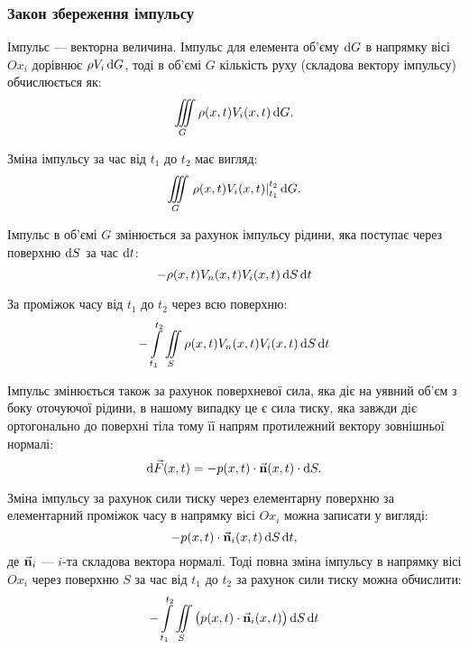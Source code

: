 \subsubsection{Закон збереження імпульсу}

Імпульс --- векторна величина. Імпульс для елемента об'єму $\diff G$ в напрямку вісі $Ox_i$ дорівнює $\rho V_i \diff G$, тоді в об'ємі $G$ кількість руху (складова вектору імпульсу) обчислюється як:
\begin{equation}
	\Iiint_G \rho(x, t) V_i(x, t) \diff G.
\end{equation}

Зміна імпульсу за час від $t_1$ до $t_2$ має вигляд: 
\begin{equation}
	\Iiint_G \left. \rho(x, t) V_i(x, t) \right|_{t_1}^{t_2} \diff G.
\end{equation}

Імпульс в об'ємі $G$ змінюється за рахунок імпульсу рідини, яка поступає через поверхню $\diff S$ за час $\diff t$:
\begin{equation}
	- \rho(x, t) V_n(x, t) V_i(x, t) \diff S \diff t
\end{equation}

За проміжок часу від $t_1$ до $t_2$ через всю поверхню:
\begin{equation}
	- \Int_{t_1}^{t_2} \Iint_S \rho(x, t) V_n(x, t) V_i(x, t) \diff S \diff t
\end{equation}

Імпульс змінюється також за рахунок поверхневої сила, яка діє на уявний об'єм з боку оточуючої рідини, в нашому випадку це є сила тиску, яка завжди діє ортогонально до поверхні тіла тому її напрям протилежний вектору зовнішньої нормалі: 
\begin{equation}
	\diff \vec F(x, t) = - p(x, t) \cdot \vec{\bf{n}} (x, t) \cdot \diff S.
\end{equation}

Зміна імпульсу за рахунок сили тиску через елементарну поверхню за елементарний проміжок часу в напрямку вісі $Ox_i$ можна записати у вигляді: 
\begin{equation}
	-p(x, t) \cdot \vec{\bf{n}}_i (x, t) \diff S \diff t,
\end{equation}
де $\vec{\bf{n}}_i$ --- $i$-та складова вектора нормалі. Тоді повна зміна імпульсу в напрямку вісі $Ox_i$ через поверхню $S$ за час від $t_1$ до $t_2$ за рахунок сили тиску можна обчислити:
\begin{equation}
	- \Int_{t_1}^{t_2} \Iint_S \big( p(x, t) \cdot \vec{\bf{n}}_i(x, t) \big) \diff S \diff t
\end{equation}

